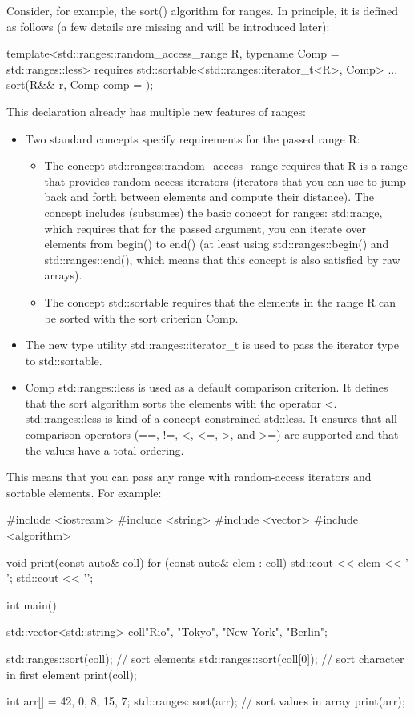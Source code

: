 Consider, for example, the sort() algorithm for ranges. In principle, it is defined as follows (a few details are missing and will be introduced later):

\begin{cpp}
template<std::ranges::random_access_range R,
		typename Comp = std::ranges::less>
requires std::sortable<std::ranges::iterator_t<R>, Comp>
... sort(R&& r, Comp comp = {});
\end{cpp}

This declaration already has multiple new features of ranges:

\begin{itemize}
\item
Two standard concepts specify requirements for the passed range R:

\begin{itemize}
\item
The concept std::ranges::random\_access\_range requires that R is a range that provides random-access iterators (iterators that you can use to jump back and forth between elements and compute their distance). The concept includes (subsumes) the basic concept for ranges: std::range, which requires that for the passed argument, you can iterate over elements from begin() to end() (at least using std::ranges::begin() and std::ranges::end(), which means that this concept is also satisfied by raw arrays).

\item
The concept std::sortable requires that the elements in the range R can be sorted with the sort criterion Comp.
\end{itemize}

\item
The new type utility std::ranges::iterator\_t is used to pass the iterator type to std::sortable.

\item
Comp std::ranges::less is used as a default comparison criterion. It defines that the sort algorithm sorts the elements with the operator <. std::ranges::less is kind of a concept-constrained std::less. It ensures that all comparison operators (==, !=, <, <=, >, and >=) are supported and that the values have a total ordering.
\end{itemize}

This means that you can pass any range with random-access iterators and sortable elements. For example:


\begin{cpp}
#include <iostream>
#include <string>
#include <vector>
#include <algorithm>

void print(const auto& coll) {
	for (const auto& elem : coll) {
		std::cout << elem << ' ';
	}
	std::cout << '\n';
}

int main()
{
	std::vector<std::string> coll{"Rio", "Tokyo", "New York", "Berlin"};
	
	std::ranges::sort(coll); // sort elements
	std::ranges::sort(coll[0]); // sort character in first element
	print(coll);
	
	int arr[] = {42, 0, 8, 15, 7};
	std::ranges::sort(arr); // sort values in array
	print(arr);
}
\end{cpp}

